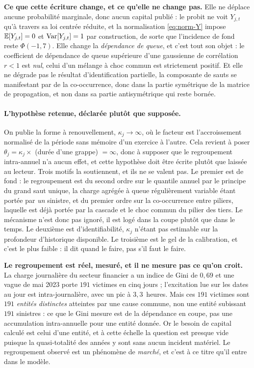 \begin{cle}
\textbf{Ce que cette écriture change, et ce qu'elle ne change pas.} Elle ne déplace
aucune probabilité marginale, donc aucun capital publié : le probit ne voit
$Y_{j,t}$ qu'à travers sa loi centrée réduite, et la normalisation \eqref{eq:norm-Y} impose
$\mathbb{E}[Y_{j,t}]=0$ et $\mathrm{Var}[Y_{j,t}]=1$ par construction, de sorte que l'incidence de fond reste
$\Phi(-1{,}7)$. Elle change la \emph{dépendance de queue}, et c'est tout son objet : le
coefficient de dépendance de queue supérieure d'une gaussienne de corrélation $r<1$ est
\emph{nul}, celui d'un mélange à choc commun est strictement positif. Et elle ne dégrade pas le
résultat d'identification partielle, la composante de sauts se manifestant par de la
co-occurrence, donc dans la partie symétrique de la matrice de propagation, et non dans sa
partie antisymétrique qui reste bornée.
\end{cle}

\paragraph{L'hypothèse retenue, déclarée plutôt que supposée.} On publie la forme à
renouvellement, $\kappa_j\to\infty$, où le facteur est l'accroissement normalisé de la période
sans mémoire d'un exercice à l'autre. Cela revient à poser $\theta_j=\kappa_j\times$ (durée
d'une grappe) $=\infty$, donc à supposer que le regroupement intra-annuel n'a aucun effet, et
cette hypothèse doit être écrite plutôt que laissée au lecteur. Trois motifs la soutiennent, et
ils ne se valent pas. Le premier est de fond : le regroupement est du second ordre sur le
quantile annuel par le principe du grand saut unique, la charge agrégée à queue régulièrement
variable étant portée par \emph{un} sinistre, et du premier ordre sur la co-occurrence entre
piliers, laquelle est déjà portée par la cascade et le choc commun du pilier des tiers. Le
mécanisme n'est donc pas ignoré, il est logé dans la coupe plutôt que dans le temps. Le
deuxième est d'identifiabilité, $\kappa_j$ n'étant pas estimable sur la profondeur d'historique
disponible. Le troisième est le gel de la calibration, et c'est le plus faible : il dit quand le
faire, pas s'il faut le faire.

\begin{attention}
\textbf{Le regroupement est réel, mesuré, et il ne mesure pas ce qu'on croit.} La charge
journalière du secteur financier a un indice de Gini de $0{,}69$ et une vague de mai 2023 porte
$191$ victimes en cinq jours ; l'excitation lue sur les dates au jour est
intra-journalière, avec un pic à $3{,}3$~heures. Mais ces $191$ victimes
sont $191$ \emph{entités distinctes} atteintes par une cause commune, non une entité subissant
$191$ sinistres : ce que le Gini mesure est de la dépendance en coupe, pas une
accumulation intra-annuelle pour une entité donnée. Or le besoin de capital calculé est celui
d'une entité, et à cette échelle la question est presque vide puisque la quasi-totalité des
années y sont sans aucun incident matériel. Le regroupement observé est un phénomène de
\emph{marché}, et c'est à ce titre qu'il entre dans le modèle.
\end{attention}

